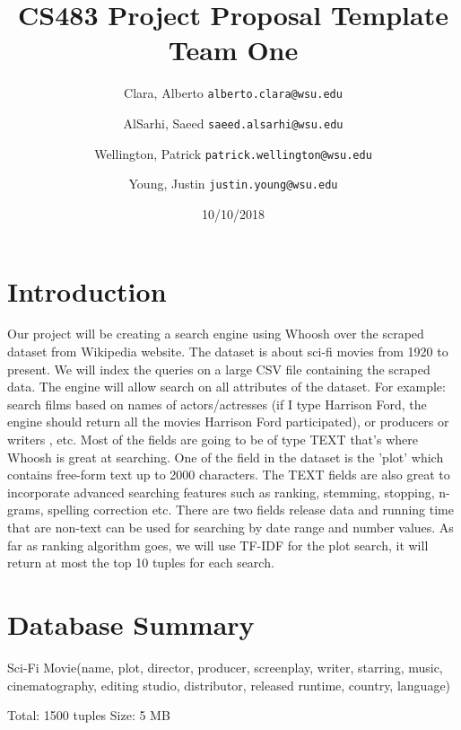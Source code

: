\documentclass[11pt]{article}
\title{CS483 Project Proposal Template\\
\large Team One}
\author{
  Clara, Alberto      \texttt{alberto.clara@wsu.edu}
  \and
  AlSarhi, Saeed      \texttt{saeed.alsarhi@wsu.edu}
  \and
  Wellington, Patrick      \texttt{patrick.wellington@wsu.edu}
  \and
  Young, Justin      \texttt{justin.young@wsu.edu}
}
\date{10/10/2018}
\begin{document}
\maketitle

\section{Introduction}
Our project will be creating a search engine  using Whoosh over the scraped dataset from Wikipedia website. The dataset is about sci-fi movies from 1920 to present. We will index the queries on a large CSV file containing the scraped data. The engine will allow search on all attributes of the dataset. For example: search films based on names of actors/actresses (if I type Harrison Ford, the engine should return all the movies Harrison Ford participated), or producers or writers , etc.  Most of the fields are going to be of type TEXT that's where Whoosh is great at searching. One of the field in the dataset is the 'plot' which contains free-form text up to 2000 characters. The TEXT fields are also great to incorporate advanced searching features such as ranking, stemming, stopping, n-grams, spelling correction etc.  There are two fields release data and running time that are non-text can be used for searching by date range and number values. As far as ranking algorithm goes, we will use TF-IDF for the plot search, it will return at most the top 10 tuples for each search.

\section{Database Summary}
Sci-Fi Movie(name, plot, director, producer, screenplay, writer, starring, music, cinematography, editing studio, distributor, released runtime, country, language)
 
Total: 1500 tuples
Size: 5 MB
\end{document}
